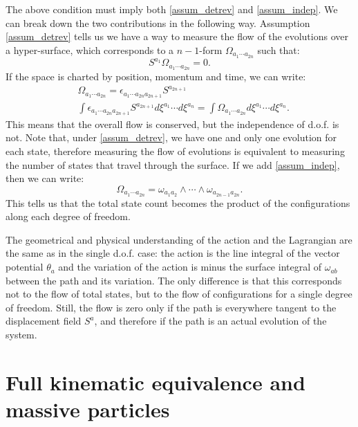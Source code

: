 The above condition must imply both \ref{assum_detrev} and \ref{assum_indep}. We can break down the two contributions in the following way. Assumption \ref{assum_detrev} tells us we have a way to measure the flow of the evolutions over a hyper-surface, which corresponds to a $n-1$-form $\Omega_{a_1 \cdots a_{2n}}$ such that:
\begin{equation}
	S^{a_1} \Omega_{a_1 \cdots a_{2n}} = 0.
\end{equation}
If the space is charted by position, momentum and time, we can write:
\begin{equation}
	\begin{aligned}
	&\Omega_{a_1 \cdots a_{2n}} = \epsilon_{a_1 \cdots a_{2n}a_{2n+1}} S^{a_{2n+1}} \\
	&\int \epsilon_{a_1 \cdots a_{2n}a_{2n+1}} S^{a_{2n+1}} d\xi^{a_1}\cdots d\xi^{a_n} = \int \Omega_{a_1 \cdots a_{2n}} d\xi^{a_1}\cdots d\xi^{a_n}.
	\end{aligned}
\end{equation}
This means that the overall flow is conserved, but the independence of d.o.f. is not. Note that, under \ref{assum_detrev}, we have one and only one evolution for each state, therefore measuring the flow of evolutions is equivalent to measuring the number of states that travel through the surface. If we add \ref{assum_indep}, then we can write:
\begin{equation}
	\Omega_{a_1 \cdots a_{2n}} = \omega_{a_1 a_2} \wedge \cdots \wedge \omega_{a_{2n-1} a_{2n}}.
\end{equation}
This tells us that the total state count becomes the product of the configurations along each degree of freedom.

The geometrical and physical understanding of the action and the Lagrangian are the same as in the single d.o.f. case: the action is the line integral of the vector potential $\theta_a$ and the variation of the action is minus the surface integral of $\omega_{ab}$ between the path and its variation. The only difference is that this corresponds not to the flow of total states, but to the flow of configurations for a single degree of freedom. Still, the flow is zero only if the path is everywhere tangent to the displacement field $S^a$, and therefore if the path is an actual evolution of the system.

\section{Full kinematic equivalence and massive particles}

